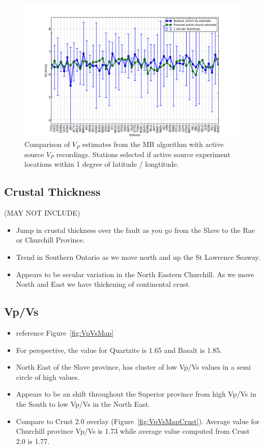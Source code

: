 \documentclass[draft, 12pt]{article}
\begin{document}
\begin{figure}
  \centering
    \includegraphics[width=\textwidth]{activeSourceComparison}
  \caption{Comparison of $V_P$ estimates from the MB algorithm with active source $V_P$ recordings. Stations selected if active source experiment locations within 1 degree of latitude / longtitude.}
  \label{fig:activeComp}
\end{figure}

\subsection{Crustal Thickness}
 (MAY NOT INCLUDE)
\begin{itemize}
  \item Jump in crustal thickness over the fault as you go from the Slave to the Rae or Churchill Province.
  \item Trend in Southern Ontario as we move north and up the St Lawrence Seaway.
  \item Appears to be secular variation in the North Eastern Churchill. As we move North and East we have thickening of continental crust.
\end{itemize}

\subsection{Vp/Vs}
\begin{itemize}
  \item reference Figure~\ref{fig:VpVsMap}
  \item For perspective, the value for Quartzite is 1.65 and Basalt is 1.85.
  \item North East of the Slave province, has cluster of low Vp/Vs values in a semi circle of high values.
  \item Appears to be an shift throughout the Superior province from high Vp/Vs in the South to low Vp/Vs in the North East.
  \item Compare to Crust 2.0 overlay (Figure~\ref{fig:VpVsMapCrust}).  Average value for Churchill province Vp/Vs is 1.73 while average value computed from Crust 2.0 is 1.77.
\end{itemize}
\end{document}
